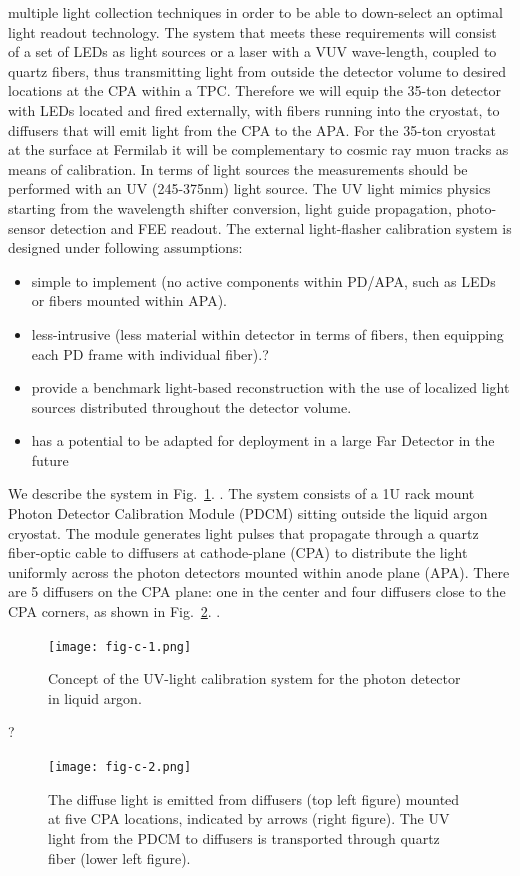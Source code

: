 multiple light collection techniques in order to be able to
down-select an optimal light readout technology. The system that meets
these requirements will consist of a set of LEDs as light sources or a
laser with a VUV wave-length, coupled to quartz fibers, thus
transmitting light from outside the detector volume to desired
locations at the CPA within a TPC. Therefore we will equip the 35-ton
detector with LEDs located and fired externally, with fibers running
into the cryostat, to diffusers that will emit light from the CPA to
the APA. For the 35-ton cryostat at the surface at Fermilab it will be
complementary to cosmic ray muon tracks as means of calibration. In
terms of light sources the measurements should be performed with an UV
(245-375nm) light source. The UV light mimics physics starting from
the wavelength shifter conversion, light guide propagation,
photo-sensor detection and FEE readout.  The external light-flasher
calibration system is designed under following assumptions:
\begin{itemize}
\item simple to implement (no active components within PD/APA, such as
  LEDs or fibers mounted within APA).
\item less-intrusive (less material within detector in terms of
  fibers, then equipping each PD frame with individual fiber).?\item
  provide a benchmark light-based reconstruction with the use of
  localized light sources distributed throughout the detector volume.
\item has a potential to be adapted for deployment in a large Far
  Detector in the future
\end{itemize}

We describe the system in Fig.~\ref{fig:fig-c-1}. . The system
consists of a 1U rack mount Photon Detector Calibration Module (PDCM)
sitting outside the liquid argon cryostat. The module generates light
pulses that propagate through a quartz fiber-optic cable to diffusers
at cathode-plane (CPA) to distribute the light uniformly across the
photon detectors mounted within anode plane (APA).  There are 5
diffusers on the CPA plane: one in the center and four diffusers close
to the CPA corners, as shown in Fig.~\ref{fig:fig-c-2}. .
%
 \begin{figure}[h]
  \centering
\texttt{[image: fig-c-1.png]}
\caption[Concept of the UV-light calibration system]{Concept of the UV-light calibration system for the photon
  detector in liquid argon.}
\label{fig:fig-c-1}
\end{figure}
%
?%
 \begin{figure}[h]
  \centering
\texttt{[image: fig-c-2.png]}
\caption[Diagrams of diffusers, their locations and UV light transport]{The diffuse light is emitted from diffusers (top left figure)
  mounted at five CPA locations, indicated by arrows (right figure).
  The UV light from the PDCM to diffusers is transported through
  quartz fiber (lower left figure).}
\label{fig:fig-c-2}
\end{figure}
%

